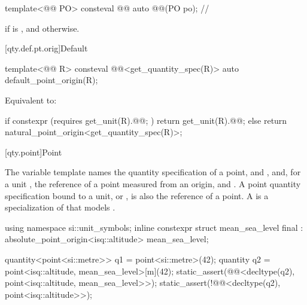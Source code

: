 \begin{itemdecl}
template<@@ PO>
consteval @@ auto @@(PO po);  // \expos
\end{itemdecl}

\begin{itemdescr}
\pnum
\returns
{}
if  is ,
and  otherwise.
\end{itemdescr}

[qty.def.pt.orig]{Default}

\begin{itemdecl}
template<@@ R>
consteval @@<get_quantity_spec(R{})> auto default_point_origin(R);
\end{itemdecl}

\begin{itemdescr}
\pnum
\effects
Equivalent to:
\begin{codeblock}
if constexpr (requires { get_unit(R{}).@@; })
  return get_unit(R{}).@@;
else
  return natural_point_origin<get_quantity_spec(R{})>;
\end{codeblock}
\end{itemdescr}

[qty.point]{Point}

\pnum
The variable template  names
the quantity specification of a point,  and ,
and, for a unit , the reference of a point measured from an origin,
 and .
A point quantity specification bound to a unit,  or ,
is also the reference of a point.
A  is a specialization of 
that models .
\begin{example}
\begin{codeblock}
using namespace si::unit_symbols;
inline constexpr struct mean_sea_level final : absolute_point_origin<isq::altitude> {} mean_sea_level;

quantity<point<si::metre>> q1 = point<si::metre>(42);
quantity q2 = point<isq::altitude, mean_sea_level>[m](42);
static_assert(@@<decltype(q2), point<isq::altitude, mean_sea_level>>);
static_assert(!@@<decltype(q2), point<isq::altitude>>);
\end{codeblock}
\end{example}

